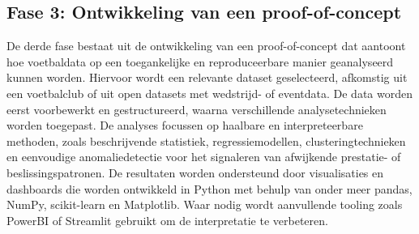 \subsection*{Fase 3: Ontwikkeling van een proof-of-concept}
De derde fase bestaat uit de ontwikkeling van een proof-of-concept dat aantoont hoe voetbaldata op een toegankelijke en reproduceerbare manier geanalyseerd kunnen worden.
Hiervoor wordt een relevante dataset geselecteerd, afkomstig uit een voetbalclub of uit open datasets met wedstrijd- of eventdata.
De data worden eerst voorbewerkt en gestructureerd, waarna verschillende analysetechnieken worden toegepast.
De analyses focussen op haalbare en interpreteerbare methoden, zoals beschrijvende statistiek, regressiemodellen, clusteringtechnieken en eenvoudige anomaliedetectie voor het signaleren van afwijkende prestatie- of beslissingspatronen.
De resultaten worden ondersteund door visualisaties en dashboards die worden ontwikkeld in Python met behulp van onder meer pandas, NumPy, scikit-learn en Matplotlib.
Waar nodig wordt aanvullende tooling zoals PowerBI of Streamlit gebruikt om de interpretatie te verbeteren.

